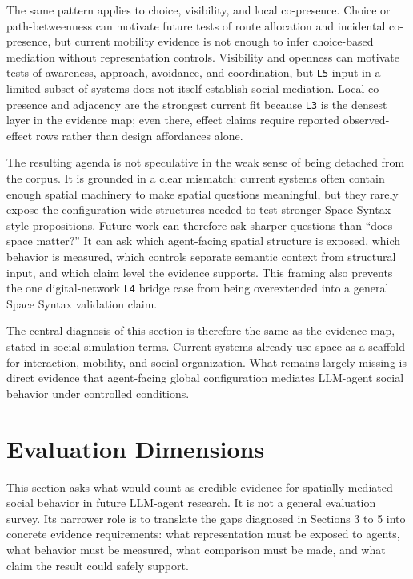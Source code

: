 \documentclass[
  twocolumn]{article}
\begin{document}
The same pattern applies to choice, visibility, and local co-presence.
Choice or path-betweenness can motivate future tests of route allocation
and incidental co-presence, but current mobility evidence is not enough
to infer choice-based mediation without representation controls.
Visibility and openness can motivate tests of awareness, approach,
avoidance, and coordination, but \texttt{L5} input in a limited subset
of systems does not itself establish social mediation. Local co-presence
and adjacency are the strongest current fit because \texttt{L3} is the
densest layer in the evidence map; even there, effect claims require
reported observed-effect rows rather than design affordances alone.

The resulting agenda is not speculative in the weak sense of being
detached from the corpus. It is grounded in a clear mismatch: current
systems often contain enough spatial machinery to make spatial questions
meaningful, but they rarely expose the configuration-wide structures
needed to test stronger Space Syntax-style propositions. Future work can
therefore ask sharper questions than ``does space matter?'' It can ask
which agent-facing spatial structure is exposed, which behavior is
measured, which controls separate semantic context from structural
input, and which claim level the evidence supports. This framing also
prevents the one digital-network \texttt{L4} bridge case from being
overextended into a general Space Syntax validation claim.

The central diagnosis of this section is therefore the same as the
evidence map, stated in social-simulation terms. Current systems already
use space as a scaffold for interaction, mobility, and social
organization. What remains largely missing is direct evidence that
agent-facing global configuration mediates LLM-agent social behavior
under controlled conditions.

\section{Evaluation Dimensions}\label{evaluation-dimensions}

This section asks what would count as credible evidence for spatially
mediated social behavior in future LLM-agent research. It is not a
general evaluation survey. Its narrower role is to translate the gaps
diagnosed in Sections 3 to 5 into concrete evidence requirements: what
representation must be exposed to agents, what behavior must be
measured, what comparison must be made, and what claim the result could
safely support.
\end{document}
